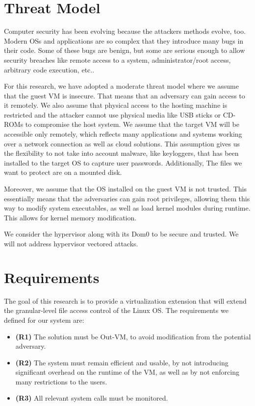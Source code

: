 \section{Threat Model}\label{sec:threat}

Computer security has been evolving because the attackers methods evolve, too. Modern \acp{OS} and applications are so complex that they introduce many bugs in their code. Some of these bugs are benign, but some are serious enough to allow security breaches like remote access to a system, administrator/root access, arbitrary code execution, etc..

\par For this research, we have adopted a moderate threat model where we assume that the guest \ac{VM} is insecure. That means that an adversary can gain access to it remotely. We also assume that physical access to the hosting machine is restricted and the attacker cannot use physical media like USB sticks or CD-ROMs to compromise the host system. We assume that the target \ac{VM} will be accessible only remotely, which reflects many applications and systems working over a network connection as well as cloud solutions. This assumption gives us the flexibility to not take into account malware, like keyloggers, that has been installed to the target \ac{OS} to capture user passwords. Additionally, The files we want to protect are on a mounted disk.

\par Moreover, we assume that the \ac{OS} installed on the guest \ac{VM} is not trusted. This essentially means that the adversaries can gain root privileges, allowing them this way to modify system executables, as well as load kernel modules during runtime. This allows for kernel memory modification.

\par We consider the hypervisor along with its Dom0 to be secure and trusted. We will not address hypervisor vectored attacks.

\section{Requirements}\label{sec:requirements}
The goal of this research is to provide a virtualization extension that will extend the granular-level file access control of the Linux \ac{OS}. The requirements we defined for our system are:
\begin{itemize}
	\item \textbf{(R1)} The solution must be Out-VM, to avoid modification from the potential adversary. 
	\item \textbf{(R2)} The system must remain efficient and usable, by not introducing significant overhead on the runtime of the \ac{VM}, as well as by not enforcing many restrictions to the users. 
	\item \textbf{(R3)} All relevant system calls must be monitored.
\end{itemize}


